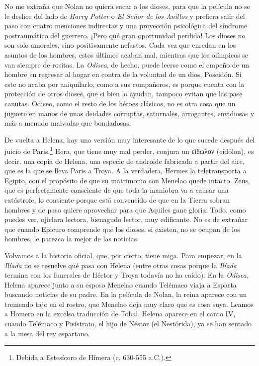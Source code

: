 \documentclass[11pt,a4paper]{article}
\newcommand{\gr}[1]{\foreignlanguage{greek}{#1}}
\begin{document}
No me extraña que Nolan no quiera sacar a los dioses, para que la película no se le deslice del lado de \emph{Harry Potter} o \emph{El Señor de los Anillos} y prefiera salir del paso con cuatro menciones indirectas y una proyección psicológica del síndrome postraumático del guerrero. ¡Pero qué gran oportunidad perdida! Los dioses no son solo amorales, sino positivamente nefastos. Cada vez que enredan en los asuntos de los hombres, estos últimos acaban mal, mientras que los olímpicos se van siempre de rositas. La \emph{Odisea}, de hecho, puede leerse como el empeño de un hombre en regresar al hogar en contra de la voluntad de un dios, Poseidón. Si este no acaba por aniquilarlo, como a sus compañeros, es porque cuenta con la protección de otros dioses, que si bien lo ayudan, tampoco evitan que las pase canutas. Odiseo, como el resto de los héroes clásicos, no es otra cosa que un juguete en manos de unas deidades corruptas, saturnales, arrogantes, envidiosas y más a menudo malvadas que bondadosas.

De vuelta a Helena, hay una versión muy interesante de lo que sucede después del juicio de Paris.\footnote{Debida a Estesícoro de Hímera (c. 630-555 a.C.).} Hera, que tiene muy mal perder, conjura un \gr{εἴδωλον} (eídōlon), es decir, una copia de Helena, una especie de androide fabricada a partir del aire, que es la que se lleva Paris a Troya. A la verdadera, Hermes la teletransporta a Egipto, con el propósito de que su matrimonio con Menelao quede intacto. Zeus, que es perfectamente consciente de que toda la maniobra va a causar una catástrofe, lo consiente porque está convencido de que en la Tierra sobran hombres y de paso quiere aprovechar para que Aquiles gane gloria. Todo, como puedes ver, ojiclara lectora, bienagudo lector, muy edificante. No es de extrañar que cuando Epicuro comprende que los dioses, si existen, no se ocupan de los hombres, le parezca la mejor de las noticias.

Volvamos a la historia oficial, que, por cierto, tiene miga. Para empezar, en la \emph{Ilíada} no se resuelve qué pasa con Helena (entre otras cosas porque la \emph{Ilíada} termina con los funerales de Héctor y Troya todavía no ha caído). En la \emph{Odisea}, Helena aparece junto a su esposo Menelao cuando Telémaco viaja a Esparta buscando noticias de su padre. En la película de Nolan, la reina aparece con un tremendo tajo en el rostro, que Menelao deja muy claro que es cosa suya. Leamos a Homero en la excelsa traducción de Tobal. Helena aparece en el canto IV, cuando Telémaco y Pisístrato, el hijo de Néstor (el Nestórida), ya se han sentado a la mesa del rey espartano.
\end{document}
